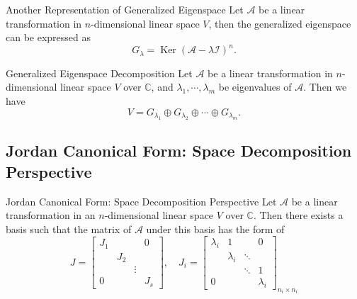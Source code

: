 \begin{lemma}{Another Representation of Generalized Eigenspace}{}
  Let $\mathcal{A}$ be a linear transformation in $n$-dimensional linear space
  $V$, then the generalized eigenspace can be expressed as
  \begin{equation}
    G_{\lambda} = \operatorname{Ker} (\mathcal{A} - \lambda \mathcal{I})^{n}.
  \end{equation}
\end{lemma}

\begin{theorem}{Generalized Eigenspace Decomposition}{}
  Let $\mathcal{A}$ be a linear transformation in $n$-dimensional linear space
  $V$ over $\mathbb{C}$,
  and $\lambda_1,\cdots,\lambda_m$ be eigenvalues of $\mathcal{A}$.
  Then we have
  \begin{equation}
    V = G_{\lambda_1} \oplus G_{\lambda_2} \oplus \cdots \oplus G_{\lambda_m}.
  \end{equation}
\end{theorem}

\subsection{Jordan Canonical Form: Space Decomposition Perspective}

\begin{theorem}{Jordan Canonical Form: Space Decomposition Perspective}{}
  Let $\mathcal{A}$ be a linear transformation in an $n$-dimensional linear
  space $V$ over $\mathbb{C}$.
  Then there exists a basis such that the matrix of $\mathcal{A}$ under this
  basis has the form of
  \begin{equation}
    J=\left[\begin{matrix}
      J_1 && & 0 \\
      & J_2 && \\
      && \vdots & \\
      0 && & J_s
    \end{matrix}\right],\quad
      J_i=\begin{bmatrix}
      \lambda_i & 1 && 0 \\
      & \lambda_i & \ddots & \\
      && \ddots & 1 \\
      0 && & \lambda_i
    \end{bmatrix}_{n_i\times n_i}
  \end{equation}
\end{theorem}

